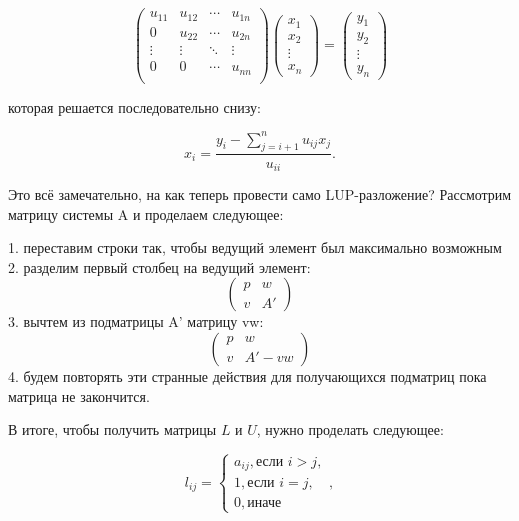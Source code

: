 \[
    \begin{pmatrix}
        u_{11} & u_{12} & \cdots & u_{1n} \\
        0 & u_{22} & \cdots & u_{2n} \\
        \vdots & \vdots & \ddots & \vdots \\
        0 & 0 & \cdots & u_{nn} \\
    \end{pmatrix}
    \begin{pmatrix}
        x_1 \\ x_2 \\ \vdots \\ x_n
    \end{pmatrix}
    =
    \begin{pmatrix}
        y_1 \\ y_2 \\ \vdots \\ y_n
    \end{pmatrix}
\]

которая решается последовательно снизу:

\[
    x_i = \frac{y_i - \sum\limits_{j=i+1}^n u_{ij} x_j}{u_{ii}}.
\]

Это всё замечательно, на как теперь провести само LUP-разложение?
Рассмотрим матрицу системы A и проделаем следующее:

1. переставим строки так, чтобы ведущий элемент был максимально возможным
2. разделим первый столбец на ведущий элемент:
    \[
        \begin{pmatrix}
            p & w \\
            v & A'
        \end{pmatrix}
    \]
3. вычтем из подматрицы A' матрицу vw:
    \[
        \begin{pmatrix}
            p & w \\
            v & A' - vw
        \end{pmatrix}
    \]
4. будем повторять эти странные действия для получающихся подматриц пока матрица
   не закончится.

В итоге, чтобы получить матрицы \( L \) и \( U \), нужно проделать следующее:

\[
    l_{ij} = \left\{\begin{array}{l}
                        a_{ij}, \text{если } i > j,\\
                        1, \text{если } i = j,\\
                        0, \text{иначе}
                    \end{array}\right.,
\]


